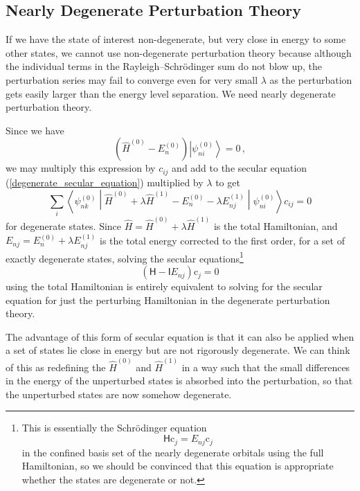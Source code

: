 \documentclass{article}
\theoremstyle{plain}\theoremheaderfont{\normalfont\itshape}\theorembodyfont{\rmfamily}\theoremseparator{.}\newtheorem*{rem}{Remark}\newtheorem*{ex}{Example}\newtheorem*{proof}{Proof}\newtheorem*{altp}{Alternative proof}
\theoremstyle{plain}\theoremheaderfont{\normalfont\bfseries}\theorembodyfont{\rmfamily}\theoremseparator{.}\newtheorem{thm}{Theorem}[section]\newtheorem{lem}[thm]{Lemma}\newtheorem{prop}[thm]{Proposition}\newtheorem*{cor}{Corollary}\newtheorem{defn}[thm]{Definition}\newtheorem{clm}[thm]{Claim}\newtheorem{clminproof}{Claim}
\theoremstyle{break}\theoremheaderfont{\normalfont\itshape}\theorembodyfont{\rmfamily}\theoremseparator{.\medskip}\newtheorem*{proofskip}{Proof}\newtheorem*{exs}{Examples}\newtheorem*{rems}{Remarks}
\theoremstyle{break}\theoremheaderfont{\normalfont\bfseries}\theorembodyfont{\rmfamily}\theoremseparator{.\medskip}\newtheorem{lemskip}[thm]{Lemma}\newtheorem{defnskip}[thm]{Definition}\newtheorem{propskip}[thm]{Proposition}\newtheorem{thmskip}[thm]{Theorem}
\numberwithin{equation}{section}
\newcommand{\ket}[1]{\left| #1 \right\rangle}
\newcommand{\mel}[3]{\left\langle #1 \middle| #2 \middle| #3 \right\rangle}
\newcommand{\vb}[1]{\bm{\mathrm{#1}}}
\begin{document}
    \subsection{Nearly Degenerate Perturbation Theory}
    If we have the state of interest non-degenerate, but very close in energy to some other states, we cannot use non-degenerate perturbation theory because although the individual terms in the Rayleigh--Schr\"{o}dinger sum do not blow up, the perturbation series may fail to converge even for very small \(\lambda\) as the perturbation gets easily larger than the energy level separation. We need nearly degenerate perturbation theory.

    Since we have
    \begin{equation}
        (\hat{H}^{(0)}-E_n^{(0)})\ket{\psi_{ni}^{(0)}}=0\,,
    \end{equation}
    we may multiply this expression by \(c_{ij}\) and add to the secular equation (\ref{degenerate_secular_equation}) multiplied by \(\lambda\) to get
    \begin{equation}
        \sum_i\mel{\psi_{nk}^{(0)}}{\hat{H}^{(0)}+\lambda\hat{H}^{(1)}-E_n^{(0)}-\lambda E_{nj}^{(1)}}{\psi_{ni}^{(0)}}c_{ij}=0
    \end{equation}
    for degenerate states. Since \(\hat{H}=\hat{H}^{(0)}+\lambda\hat{H}^{(1)}\) is the total Hamiltonian, and \(E_{nj}=E_n^{(0)}+\lambda E_{nj}^{(1)}\) is the total energy corrected to the first order, for a set of exactly degenerate states, solving the secular equations\footnote{This is essentially the Schr\"{o}dinger equation
    \begin{equation}
        \mathsf{H}\vb{c}_j=E_{nj}\vb{c}_j
    \end{equation}
    in the confined basis set of the nearly degenerate orbitals using the full Hamiltonian, so we should be convinced that this equation is appropriate whether the states are degenerate or not.}
    \begin{equation}
        (\mathsf{H}-\mathsf{I}E_{nj})\vb{c}_j=\vb{0}
    \end{equation}
    using the total Hamiltonian is entirely equivalent to solving for the secular equation for just the perturbing Hamiltonian in the degenerate perturbation theory.

    The advantage of this form of secular equation is that it can also be applied when a set of states lie close in energy but are not rigorously degenerate. We can think of this as redefining the \(\hat{H}^{(0)}\) and \(\hat{H}^{(1)}\) in a way such that the small differences in the energy of the unperturbed states is absorbed into the perturbation, so that the unperturbed states are now somehow degenerate.
\end{document}
